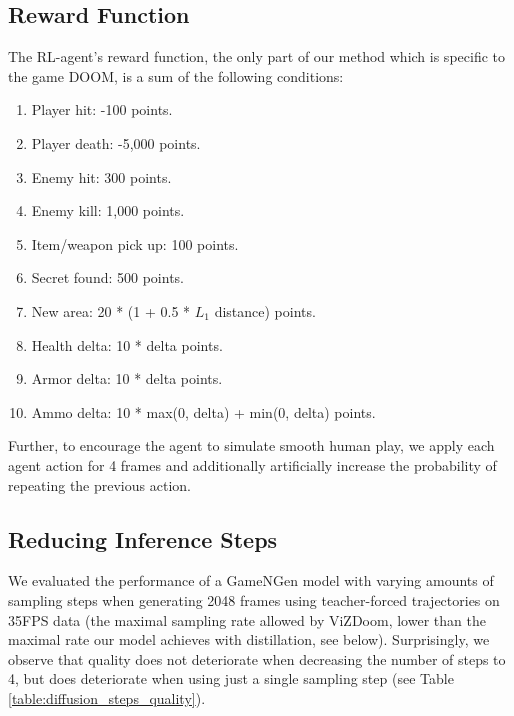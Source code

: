 \documentclass{article} %
\begin{document}
\newpage
\clearpage
\subsection{Reward Function}
\label{appendix:reward}

The RL-agent's reward function, the only part of our method which is specific to the game DOOM, is a sum of the following conditions:

\begin{enumerate}
    \item Player hit: -100 points.
    \item Player death: -5,000 points.
    \item Enemy hit: 300 points.
    \item Enemy kill: 1,000 points.
    \item Item/weapon pick up: 100 points.
    \item Secret found: 500 points.
    \item New area: 20 * (1 + 0.5 * $L_1$ distance) points.
    \item Health delta: 10 * delta points.
    \item Armor delta: 10 * delta points.
    \item Ammo delta: 10 * max(0, delta) + min(0, delta) points.
\end{enumerate}

Further, to encourage the agent to simulate smooth human play, we apply each agent action for 4 frames and additionally artificially increase the probability of repeating the previous action.

\subsection{Reducing Inference Steps}
\label{appendix:distillation}
We evaluated the performance of a GameNGen model with varying amounts of sampling steps when generating 2048 frames using teacher-forced trajectories on 35FPS data (the maximal sampling rate allowed by ViZDoom, lower than the maximal rate our model achieves with distillation, see below). Surprisingly, we observe that quality does not deteriorate when decreasing the number of steps to 4, but does deteriorate when using just a single sampling step (see Table \ref{table:diffusion_steps_quality}).
\end{document}
